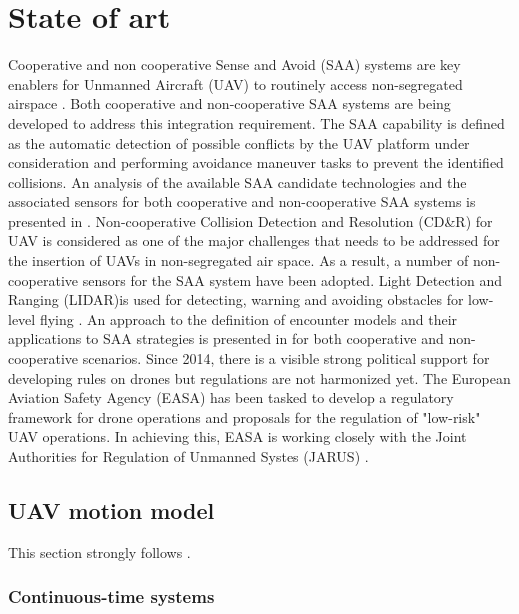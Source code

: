 \chapter{State of art}\label{ch:stateofArt}
\noindent
Cooperative and non cooperative Sense and Avoid (SAA) systems are key enablers for Unmanned Aircraft (UAV) to routinely access non-segregated airspace \cite{spriesterbach2013unmanned}. Both cooperative and non-cooperative SAA systems are being developed to address this integration requirement.
\noindent
The SAA capability is defined as the automatic detection of possible conflicts by the UAV platform under consideration and performing avoidance maneuver tasks to prevent the identified collisions. An analysis of the available SAA candidate technologies and the associated sensors for both cooperative and non-cooperative SAA systems is presented in \cite{muraru2011critical}. Non-cooperative Collision Detection and Resolution (CD\&R) for UAV is considered as one of the major challenges that needs to be addressed \cite{lai2012see} for the insertion of UAVs in non-segregated air space. As a result, a number of non-cooperative sensors for the SAA system have been adopted. Light Detection and Ranging (LIDAR)is used for detecting, warning and avoiding obstacles for low-level flying \cite{sabatini2014lidar}.
\noindent
An approach to the definition of encounter models and their applications to SAA strategies is presented in \cite{kochenderfer2008encounter} for both cooperative and non-cooperative scenarios.
\noindent
Since 2014, there is a visible strong political support for developing rules on drones but regulations are not harmonized yet. The European Aviation Safety Agency (EASA) has been tasked to develop a regulatory framework for drone operations and proposals for the regulation of "low-risk" UAV operations. In achieving this, EASA is working closely with the Joint Authorities for Regulation of Unmanned Systes (JARUS) \cite{jarus2016regulations}.
\newpage
\section{UAV motion model}
\noindent
This section strongly follows \cite{lee2011structure}.

\subsection{Continuous-time systems}

